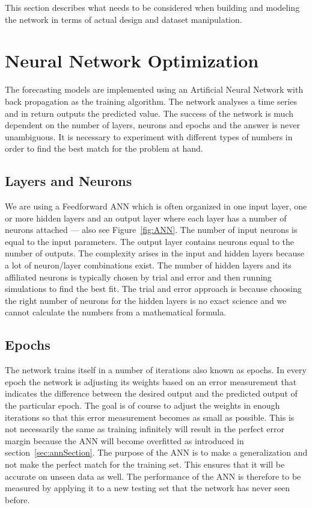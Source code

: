 This section describes what needs to be considered when building and modeling the network in terms of actual design and dataset manipulation.

\section{Neural Network Optimization}
\label{sec:neuralNetworkOptimization}
The forecasting models are implemented using an Artificial Neural Network with back propagation as the training algorithm. The network analyses a time series and in return outputs the predicted value. The success of the network is much dependent on the number of layers, neurons and epochs and the answer is never unambiguous. It is necessary to experiment with different types of numbers in order to find the best match for the problem at hand.

\subsection{Layers and Neurons}
\label{sec:layersAndNeurons}
We are using a Feedforward ANN which is often organized in one input layer, one or more hidden layers and an output layer where each layer has a number of neurons attached\cite{1} --- also see Figure~\ref{fig:ANN}. The number of input neurons is equal to the input parameters. The output layer contains neurons equal to the number of outputs. 
The complexity arises in the input and hidden layers because a lot of neuron/layer combinations exist. The number of hidden layers and its affiliated neurons is typically chosen by trial and error and then running simulations to find the best fit\cite{1}. The trial and error approach is because choosing the right number of neurons for the hidden layers is no exact science and we cannot calculate the numbers from a mathematical formula.

\subsection{Epochs}
\label{sec:epochs}
The network trains itself in a number of iterations also known as epochs. In every epoch the network is adjusting its weights based on an error measurement that indicates the difference between the desired output and the predicted output of the particular epoch\cite{1}. The goal is of course to adjust the weights in enough iterations so that this error measurement becomes as small as possible. This is not necessarily the same as training infinitely will result in the perfect error margin because the ANN will become overfitted as introduced in section~\ref{sec:annSection}. The purpose of the ANN is to make a generalization and not make the perfect match for the training set. This ensures that it will be accurate on unseen data\cite{1} as well. The performance of the ANN is therefore to be measured by applying it to a new testing set that the network has never seen before.

